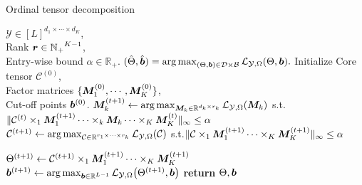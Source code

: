 \documentclass{article}
\theoremstyle{plain}
\theoremstyle{definition}
\begin{document}
\begin{algorithm}[tb]
        \caption{Ordinal tensor decomposition }\label{alg}
        \begin{algorithmic}[]
              
            $\mathcal{Y}\in [L]^{d_1\times\cdots\times d_K}
            $,\\ \hspace{.43in} Rank $\bm{r}\in \mathbb{N_+}^{K-1}$,\\
            \hspace{.43in} Entry-wise bound $\alpha\in \mathbb{R_+}$.
             $(\hat\Theta,\hat{\bm{b}}) =  \operatorname*{arg\,max}_{(\Theta,\bm{b})\in \mathcal{D}\times\mathcal{B}}  \mathcal{L}_{\mathcal{Y},\Omega}(\Theta,\bm{b}).$
            \STATE Initialize  Core tensor $\mathcal{C}^{(0)}$,\\
            \hspace{.5in} Factor matrices $ \{\bm M_1^{(0)},\cdots,\bm M_K^{(0)}\}$,\\
            \hspace{.5in} Cut-off points $\bm{b}^{(0)}$.
            \STATE $\bm M_k^{(t+1)}\gets\operatorname*{arg\,max}_{\bm M_k\in\mathbb{R}^{d_k\times r_k}}\mathcal{L}_{\mathcal{Y},\Omega}(\bm M_k)$ s.t.
             $\|\mathcal{C}^{(t)}\times_1\bm M_1^{(t+1)}\cdots\times_k\bm M_k\cdots\times_K\bm M_K^{(t)}\|_\infty \leq \alpha$
            \ENDFOR
            \STATE $\mathcal{C}^{(t+1)} \gets \operatorname*{arg\,max}_{\mathcal{C}\in \mathbb{R}^{r_1\times\cdots\times r_k}}\mathcal{L}_{\mathcal{Y},\Omega}(\mathcal{C})$
            s.t.\newline $\|\mathcal{C}\times_1\bm M_1^{(t+1)}\cdots\times_K\bm M_K^{(t+1)}\|_\infty \leq \alpha$

            \STATE $\Theta^{(t+1)} \gets \mathcal{C}^{(t+1)}\times_1\bm M_1^{(t+1)}\cdots\times_K\bm M_K^{(t+1)}$
            \STATE $\bm{b}^{(t+1)} \gets \operatorname*{arg\,max}_{\bm{b}\in \mathbb{R}^{L-1}}\mathcal{L}_{\mathcal{Y},\Omega}\big(\Theta^{(t+1)},\bm{b}\big)$
            \ENDFOR
            \STATE \textbf{return}
            $\Theta,\bm{b}$
        \end{algorithmic}
    \end{algorithm}
\end{document}
